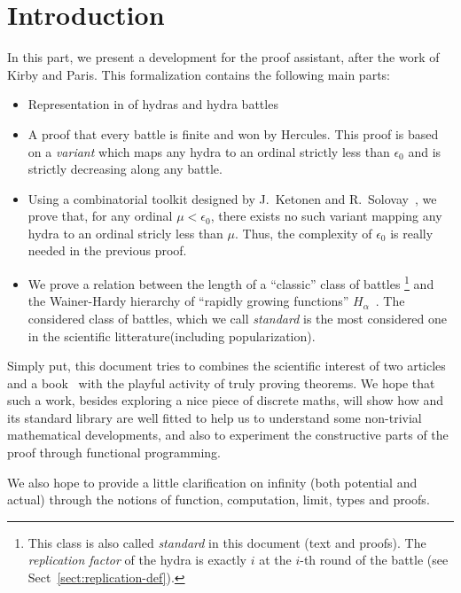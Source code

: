 \section*{Introduction}

In this part, we present a development  for the \coq{} proof assistant, after the work of Kirby and Paris. This formalization contains the following main parts:

\begin{itemize}
\item Representation in \coq{} of hydras and hydra battles
\item A proof that every battle is finite and won by Hercules. This proof is based on a \emph{variant} which maps any hydra to an ordinal strictly less than $\epsilon_0$ and is strictly decreasing along any battle.

\item Using a combinatorial toolkit designed by J.~Ketonen and R.~Solovay~\cite{KS81}, we prove that, for any ordinal $\mu<\epsilon_0$, there exists no such variant mapping any hydra to an ordinal stricly less than $\mu$. Thus, the complexity of $\epsilon_0$ is really needed in the previous proof.

\item We prove a relation between the length of a ``classic''  class of  battles \footnote{This class is also called \emph{standard} in this document (text and proofs). The \emph{replication factor} of the hydra is exactly $i$ at the $i$-th round of the battle (see Sect~\vref{sect:replication-def}).}
and the Wainer-Hardy hierarchy of ``rapidly growing functions'' $H_\alpha$~\cite{Wainer1970}. The considered class of battles, which we call \emph{standard}  is the most considered one in the scientific  litterature(including popularization).
\end{itemize}


Simply put, this document tries to combines the scientific interest of two articles~\cite{KP82, KS81} and a book~\cite{schutte} with the playful activity of truly proving theorems.
We hope  that such a work, besides exploring a nice piece of discrete maths, 
will show how \coq{} and its standard library are well fitted to help us to understand some non-trivial mathematical developments, and also to experiment the constructive parts of  the proof through functional programming.

 We also hope to provide a little clarification on infinity (both potential and actual) through the notions of function, computation, limit,
 types and proofs.



